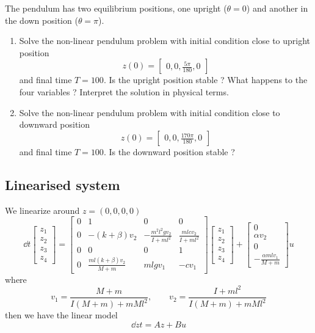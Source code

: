 \documentclass[12pt]{article}
\begin{document}
The pendulum has two equilibrium positions, one upright ($\theta=0$) and another in the down position ($\theta=\pi$).
\begin{enumerate}
\item Solve the non-linear pendulum problem with initial condition close to upright position 
\[
z(0) = \begin{bmatrix} 0, 0, \frac{5\pi}{180}, 0 \end{bmatrix}
\]
and final time $T=100$. Is the upright position stable ? What happens to the four variables ? Interpret the solution in physical terms.

\item Solve the non-linear pendulum problem with initial condition close to downward position
\[
z(0) = \begin{bmatrix} 0, 0, \frac{170\pi}{180}, 0 \end{bmatrix}
\]
and final time $T=100$. Is the downward position stable ?

\end{enumerate}
\subsection{Linearised system} 
We linearize around $z=(0,0,0,0)$
\[
\dd{}{t} \begin{bmatrix}
z_1 \\ z_2 \\ z_3 \\ z_4 \end{bmatrix} = \begin{bmatrix}
0 & 1 & 0 & 0 \\
0 & - (k+\beta) v_2 & - \frac{m^2 l^2 g v_2}{I + ml^2} & \frac{ml c v_2}{I + ml^2} \\
0 & 0 & 0 & 1 \\
0 & \frac{ml(k+\beta)v_2}{M+m} & mlgv_1 & - c  v_1
\end{bmatrix} \begin{bmatrix}
z_1 \\ z_2 \\ z_3 \\ z_4 \end{bmatrix} +
\begin{bmatrix}
0 \\ \alpha v_2 \\ 0 \\ -\frac{\alpha mlv_1}{M+m} \end{bmatrix} u
\]
where
\[
v_1 = \frac{M + m}{I(M+m) + mMl^2}, \qquad v_2 = \frac{I + ml^2}{I(M+m) + mMl^2}
\]
then we have the linear model
\[
\dd{z}{t} = Az + Bu
\]
\end{document}
